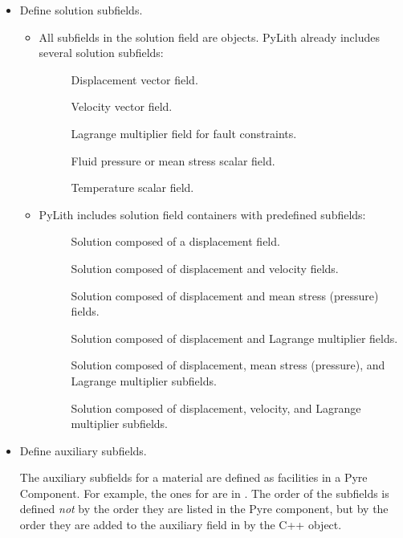 \begin{itemize}
\item Define solution subfields.

  \begin{itemize}
  \item All subfields in the solution field are 
    objects. PyLith already includes several solution subfields:
    \begin{description}
    \item[] Displacement vector field.
    \item[] Velocity vector field.
    \item[] Lagrange multiplier field for
      fault constraints.
    \item[] Fluid pressure or mean stress scalar field.
    \item[] Temperature scalar field.
    \end{description}
  \item PyLith includes solution field containers with predefined
    subfields:
    \begin{description}
    \item[] Solution composed of a displacement field.
    \item[] Solution composed of displacement and velocity fields.
    \item[] Solution composed of displacement and
      mean stress (pressure) fields.
    \item[] Solution composed of displacement
      and Lagrange multiplier fields.
    \item[] Solution composed of
      displacement, mean stress (pressure), and Lagrange multiplier subfields.
    \item[] Solution composed of
      displacement, velocity, and Lagrange multiplier subfields.
    \end{description}
  \end{itemize}
%
\item Define auxiliary subfields.

  The auxiliary subfields for a material are defined as facilities in
  a Pyre Component. For example, the ones for
   are in
  . The order of the subfields
  is defined {\em not} by the order they are listed in the Pyre
  component, but by the order they are added to the auxiliary field in
  by the C++ object. 


\end{itemize}
